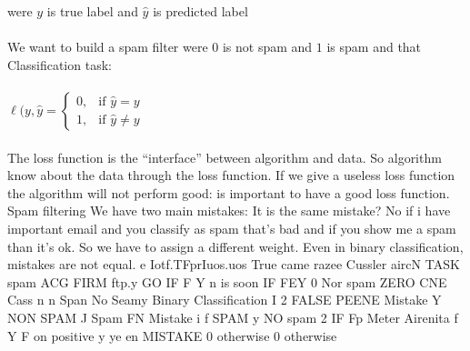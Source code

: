 \documentclass[../main.tex]{subfiles}
\begin{document}
were $y $ is true label and $\hat{y}$ is predicted label
\\\\
We want to build a spam filter were $0$ is not spam and $1$ is spam and that 
Classification task: 
\\\\
$
\ell(y,\hat{y} = \begin{cases} 0, & \mbox{if } \hat{y} = y 
\\ 1, & 
\mbox{if }\hat{y} \neq y
\end{cases}
$
\\\\
The loss function is the “interface” between algorithm and data.
So algorithm know about the data through the loss function.
If we give a useless loss function the algorithm will not perform good: is
important to have a good loss function.
Spam filtering
We have two main mistakes:
It is the same mistake? No if i have important email and you classify as spam
that’s bad and if you show me a spam than it’s ok.
So we have to assign a different weight.
Even in binary classification, mistakes are not equal.
e Iotf.TFprIuos.uos
True came
razee
Cussler aircN TASK spam ACG FIRM
ftp.y GO
IF F Y n is soon
IF FEY 0 Nor spam
ZERO CNE Cass
n n
Span No Seamy Binary Classification
I 2
FALSE PEENE Mistake Y NON SPAM J Spam
FN Mistake i f SPAM y NO spam
2 IF Fp Meter Airenita
f Y F on positive
y ye en MISTAKE
0 otherwise
0 otherwise
\end{document}
